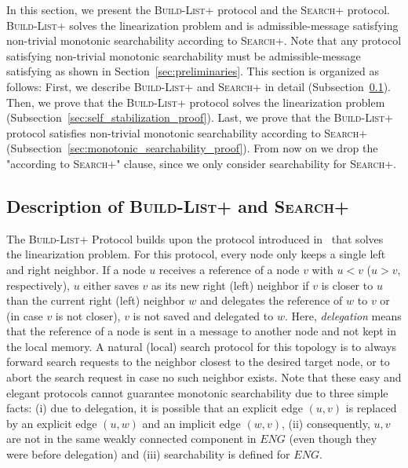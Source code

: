 \documentclass[a4paper,USenglish]{lipics}
\newcommand{\blp}{\textsc{Build-List+}\xspace}
\newcommand{\srp}{\textsc{Search+}\xspace}
\newcommand{\srpwithoutxspace}{\textsc{Search+}}
\begin{document}
In this section, we present the \blp protocol and the \srp protocol. \blp solves the linearization problem and is admissible-message satisfying non-trivial monotonic searchability according to \srp.
Note that any protocol satisfying non-trivial monotonic searchability must be admissible-message satisfying as shown in Section~\ref{sec:preliminaries}.
This section is organized as follows: 
First, we describe \blp and \srp in detail (Subsection~\ref{subsec:blp_desription}).
Then, we prove that the \blp protocol solves the linearization problem (Subsection~\ref{sec:self_stabilization_proof}).
Last, we prove that the \blp protocol satisfies non-trivial monotonic searchability according to \srp (Subsection~\ref{sec:monotonic_searchability_proof}).
From now on we drop the "according to \srpwithoutxspace" clause, since we only consider searchability for \srp.

\subsection{Description of \blp and \srp}
\label{subsec:blp_desription}
The \blp Protocol builds upon the protocol introduced in~\cite{self-stabilizing-list} that solves the linearization problem.
For this protocol, every node only keeps a single left and right neighbor. 
If a node $u$ receives a reference of a node $v$ with $u<v$ ($u>v$, respectively), $u$ either saves $v$ as its new right (left) neighbor if $v$ is closer to $u$ than the current right (left) neighbor $w$ and delegates the reference of $w$ to $v$ or (in case $v$ is not closer), $v$ is not saved and delegated to $w$.
Here, \emph{delegation} means that the reference of a node is sent in a message to another node and not kept in the local memory.
A natural (local) search protocol for this topology is to always forward search requests to the neighbor closest to the desired target node, or to abort the search request in case no such neighbor exists.
Note that these easy and elegant protocols cannot guarantee monotonic searchability due to three simple facts: (i) due to delegation, it is possible that an explicit edge $(u,v)$ is replaced by an explicit edge $(u,w)$ and an implicit edge $(w,v)$, (ii) consequently, $u,v$ are not in the same weakly connected component in $ENG$ (even though they were before delegation) and (iii) searchability is defined for $ENG$.
\end{document}
